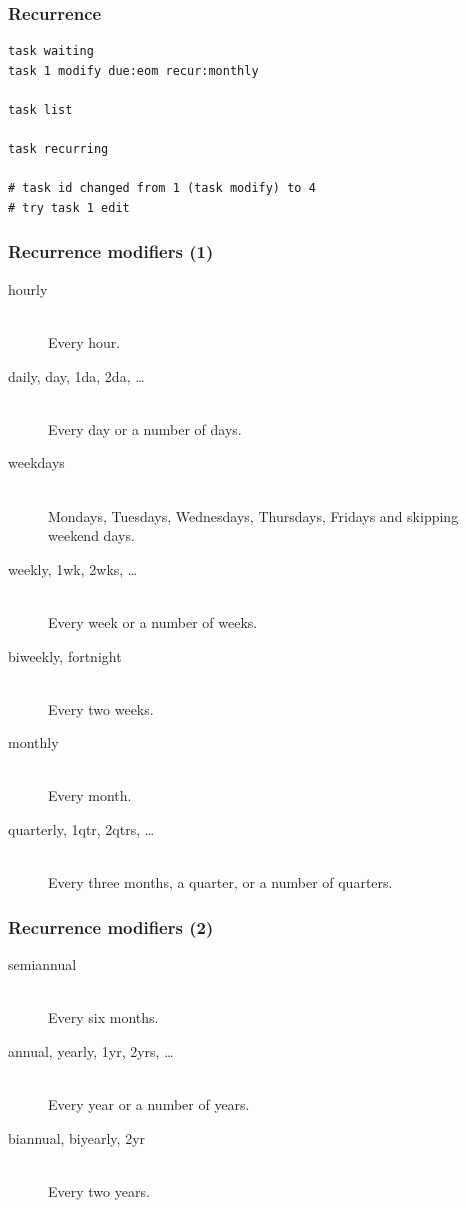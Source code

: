 \documentclass[t,handout]{beamer}
\begin{document}
\begin{frame}[fragile]\frametitle{Recurrence}
    \vfill
    \begin{lstlisting}
task waiting
task 1 modify due:eom recur:monthly

task list

task recurring

# task id changed from 1 (task modify) to 4
# try task 1 edit\end{lstlisting}
\end{frame}

\begin{frame}[fragile]\frametitle{Recurrence modifiers (1)}
    \begin{description}
        \item[hourly] \hfill \\
            Every hour.
        \item[daily, day, 1da, 2da, \ldots] \hfill \\
            Every day or a number of days.
        \item[weekdays] \hfill \\
            Mondays, Tuesdays, Wednesdays, Thursdays, Fridays and skipping weekend days.
        \item[weekly, 1wk, 2wks, \ldots] \hfill \\
            Every week or a number of weeks.
        \item[biweekly, fortnight] \hfill \\
            Every two weeks.
        \item[monthly] \hfill \\
            Every month.
        \item[quarterly, 1qtr, 2qtrs, \ldots] \hfill \\
            Every three months, a quarter, or a number of quarters.
    \end{description}
\end{frame}

\begin{frame}[fragile]\frametitle{Recurrence modifiers (2)}
    \begin{description}
        \item[semiannual] \hfill \\
            Every six months.
        \item[annual, yearly, 1yr, 2yrs, \ldots] \hfill \\
            Every year or a number of years.
        \item[biannual, biyearly, 2yr] \hfill \\
            Every two years.
    \end{description}
\end{frame}
\end{document}
